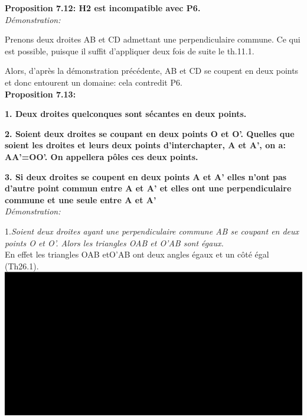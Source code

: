 \documentclass[a4paper, 12pt, twoside]{book}
\begin{document}
  \textbf{Proposition 7.12: H2 est incompatible avec P6.}\\ 
  
  \textit{Démonstration:}
  
 
 Prenons deux droites AB et CD admettant une perpendiculaire commune. Ce qui est possible, puisque il suffit d'appliquer deux fois de suite le th.11.1.\
 
  Alors, d'après la démonstration précédente, AB et CD se coupent en deux points et donc entourent un domaine: cela contredit P6. \\
  
   
 
  \textbf{Proposition 7.13:} \
  
 \textbf{ 1. Deux droites quelconques sont sécantes en deux points. }\
  
 \textbf{ 2. Soient deux droites se coupant en deux points O et O'. Quelles que soient les droites et  leurs deux points d'interchapter, A et A', on a: AA'=OO'. On appellera pôles ces deux points.}\
 
 \textbf{3. Si deux droites se coupent en deux points A et A' elles n'ont pas d'autre point commun entre A et A' et elles  ont une perpendiculaire commune et une seule entre A et A'}\\
 
 \textit{Démonstration:}
  
  
  1.\textit{Soient deux droites ayant une perpendiculaire commune AB se coupant en deux points O et O'. Alors les triangles OAB et O'AB sont égaux.}\\
  
  En effet les triangles OAB etO'AB ont deux angles égaux et un côté égal (Th26.1).\\
  
  \includegraphics[scale=0.7]{figures/sacc21bis.eps} \\
  
\end{document}
